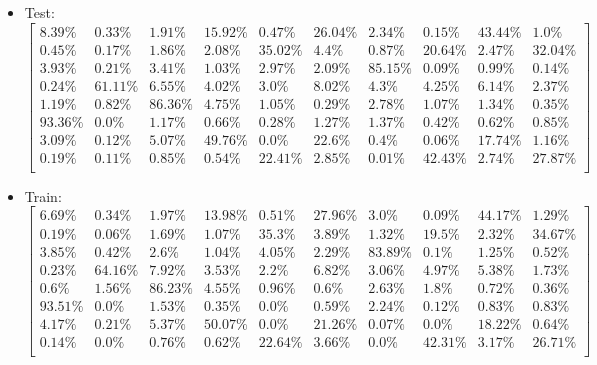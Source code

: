\documentclass[a4paper,14pt]{report}
\begin{document}
	\begin{itemize}
		\item Test:
		$
		\begin{bmatrix}
		8.39\% & 0.33\% & 1.91\% & 15.92\% & 0.47\% & 26.04\% & 2.34\% & 0.15\% & 43.44\% & 1.0\% \\ 
		0.45\% & 0.17\% & 1.86\% & 2.08\% & 35.02\% & 4.4\% & 0.87\% & 20.64\% & 2.47\% & 32.04\% \\ 
		3.93\% & 0.21\% & 3.41\% & 1.03\% & 2.97\% & 2.09\% & 85.15\% & 0.09\% & 0.99\% & 0.14\% \\ 
		0.24\% & 61.11\% & 6.55\% & 4.02\% & 3.0\% & 8.02\% & 4.3\% & 4.25\% & 6.14\% & 2.37\% \\ 
		1.19\% & 0.82\% & 86.36\% & 4.75\% & 1.05\% & 0.29\% & 2.78\% & 1.07\% & 1.34\% & 0.35\% \\ 
		93.36\% & 0.0\% & 1.17\% & 0.66\% & 0.28\% & 1.27\% & 1.37\% & 0.42\% & 0.62\% & 0.85\% \\ 
		3.09\% & 0.12\% & 5.07\% & 49.76\% & 0.0\% & 22.6\% & 0.4\% & 0.06\% & 17.74\% & 1.16\% \\ 
		0.19\% & 0.11\% & 0.85\% & 0.54\% & 22.41\% & 2.85\% & 0.01\% & 42.43\% & 2.74\% & 27.87\% \\
		\end{bmatrix} 
		$
		\item Train:
		$
		\begin{bmatrix}
		6.69\% & 0.34\% & 1.97\% & 13.98\% & 0.51\% & 27.96\% & 3.0\% & 0.09\% & 44.17\% & 1.29\% \\ 
		0.19\% & 0.06\% & 1.69\% & 1.07\% & 35.3\% & 3.89\% & 1.32\% & 19.5\% & 2.32\% & 34.67\% \\ 
		3.85\% & 0.42\% & 2.6\% & 1.04\% & 4.05\% & 2.29\% & 83.89\% & 0.1\% & 1.25\% & 0.52\% \\ 
		0.23\% & 64.16\% & 7.92\% & 3.53\% & 2.2\% & 6.82\% & 3.06\% & 4.97\% & 5.38\% & 1.73\% \\ 
		0.6\% & 1.56\% & 86.23\% & 4.55\% & 0.96\% & 0.6\% & 2.63\% & 1.8\% & 0.72\% & 0.36\% \\ 
		93.51\% & 0.0\% & 1.53\% & 0.35\% & 0.0\% & 0.59\% & 2.24\% & 0.12\% & 0.83\% & 0.83\% \\ 
		4.17\% & 0.21\% & 5.37\% & 50.07\% & 0.0\% & 21.26\% & 0.07\% & 0.0\% & 18.22\% & 0.64\% \\ 
		0.14\% & 0.0\% & 0.76\% & 0.62\% & 22.64\% & 3.66\% & 0.0\% & 42.31\% & 3.17\% & 26.71\% \\
		\end{bmatrix} 
		$
	\end{itemize}
\end{document}
